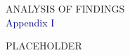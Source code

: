 \pagebreak
\pagestyle{plain}
\pagecolor{ccgreen}
\pagebreak
{}
\pagestyle{fancy}
\fancyhf{}
\renewcommand{\chaptermark}[1]{\markboth{#1}{}}
\fancyfoot[LE,RO]{\thepage}
\textcolor{ccgreen}{ANALYSIS OF FINDINGS}
\\


\pagebreak
\pagestyle{plain}
\pagecolor{lightBlue}
\pagebreak
{}
\pagestyle{fancy}
\fancyhf{}
\renewcommand{\chaptermark}[1]{\markboth{#1}{}}
\fancyfoot[LE,RO]{\thepage}
\textcolor{darkBlue}{Appendix I}

PLACEHOLDER

\pagebreak


